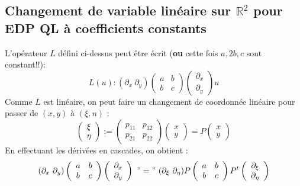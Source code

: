 \documentclass	[11pt, a4paper, openany]{book}
\begin{document}
\subsection{Changement de variable linéaire sur $\mathbb{R}^2$ pour EDP QL à coefficients constants}
L'opérateur $L$ défini ci-dessus peut être écrit (\textbf{ou} cette fois $a,2b,c$ sont constant!!):
\begin{equation}
L(u) : (\partial_x\ \partial_y)\left(\begin{array}{cc}
a & b\\
b & c
\end{array}\right)\left(\begin{array}{c}
\partial_x\\
\partial_y
\end{array}\right)u
\end{equation}
Comme $L$ est linéaire, on peut faire un changement de coordonnée linéaire pour passer de $(x,y)$ à $(\xi,n)$ :
\begin{equation}
\left(\begin{array}{c}
\xi\\
\eta
\end{array}\right) := \left(\begin{array}{cc}
p_{11} & p_{12}\\
p_{21} & p_{22}
\end{array}\right)\left(\begin{array}{c}
x\\
y
\end{array}\right) = P\left(\begin{array}{c}
x\\
y
\end{array}\right)
\end{equation}
En effectuant les dérivées en cascades, on obtient :
\begin{equation}
(\partial_x\ \partial_y)\left(\begin{array}{cc}
a & b\\
b & c
\end{array}\right)\left(\begin{array}{c}
\partial_x\\
\partial_y
\end{array}\right)\ "="\  (\partial_\xi\ \partial_\eta)P\left(\begin{array}{cc}
a & b\\
b & c
\end{array}\right)P^t\left(\begin{array}{c}
\partial_\xi\\
\partial_\eta
\end{array}\right)
\end{equation}
\end{document}
